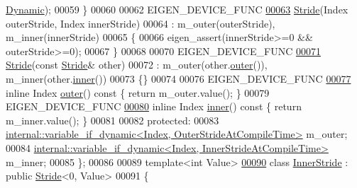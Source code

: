 \begin{DoxyCode}
      \hyperlink{namespace_eigen_ad81fa7195215a0ce30017dfac309f0b2}{Dynamic});
00059     \}
00060 
00062     EIGEN\_DEVICE\_FUNC
\hyperlink{group___core___module_ab769b5a97db488b06bf305f4ab970189}{00063}     \hyperlink{group___core___module_ab769b5a97db488b06bf305f4ab970189}{Stride}(Index outerStride, Index innerStride)
00064       : m\_outer(outerStride), m\_inner(innerStride)
00065     \{
00066       eigen\_assert(innerStride>=0 && outerStride>=0);
00067     \}
00068 
00070     EIGEN\_DEVICE\_FUNC
\hyperlink{group___core___module_a052fed680cf28ea284714be591bfbf86}{00071}     \hyperlink{group___core___module_a052fed680cf28ea284714be591bfbf86}{Stride}(\textcolor{keyword}{const} \hyperlink{group___core___module_class_eigen_1_1_stride}{Stride}& other)
00072       : m\_outer(other.\hyperlink{group___core___module_a261eede5809599db183b49bc274f8a07}{outer}()), m\_inner(other.\hyperlink{group___core___module_a24579b0e941cebef474c666e6d936b3b}{inner}())
00073     \{\}
00074 
00076     EIGEN\_DEVICE\_FUNC
\hyperlink{group___core___module_a261eede5809599db183b49bc274f8a07}{00077}     \textcolor{keyword}{inline} Index \hyperlink{group___core___module_a261eede5809599db183b49bc274f8a07}{outer}()\textcolor{keyword}{ const }\{ \textcolor{keywordflow}{return} m\_outer.value(); \}
00079     EIGEN\_DEVICE\_FUNC
\hyperlink{group___core___module_a24579b0e941cebef474c666e6d936b3b}{00080}     \textcolor{keyword}{inline} Index \hyperlink{group___core___module_a24579b0e941cebef474c666e6d936b3b}{inner}()\textcolor{keyword}{ const }\{ \textcolor{keywordflow}{return} m\_inner.value(); \}
00081 
00082   \textcolor{keyword}{protected}:
00083     \hyperlink{class_eigen_1_1internal_1_1variable__if__dynamic}{internal::variable\_if\_dynamic<Index, OuterStrideAtCompileTime>}
       m\_outer;
00084     \hyperlink{class_eigen_1_1internal_1_1variable__if__dynamic}{internal::variable\_if\_dynamic<Index, InnerStrideAtCompileTime>}
       m\_inner;
00085 \};
00086 
00089 \textcolor{keyword}{template}<\textcolor{keywordtype}{int} Value>
\hyperlink{class_eigen_1_1_inner_stride}{00090} \textcolor{keyword}{class }\hyperlink{class_eigen_1_1_inner_stride}{InnerStride} : \textcolor{keyword}{public} \hyperlink{group___core___module_class_eigen_1_1_stride}{Stride}<0, Value>
00091 \{

\end{DoxyCode}
